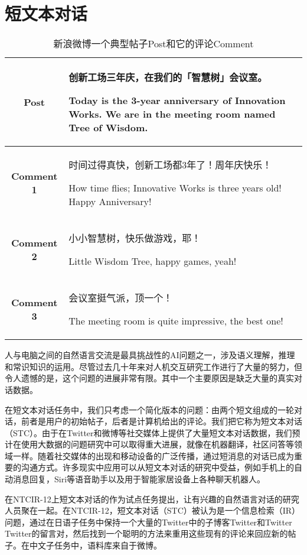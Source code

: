 \chapter{短文本对话}

\begin{table}[htbp]
\centering
\caption{新浪微博一个典型帖子Post和它的评论Comment} \label{tab:example_STC}
\begin{tabular}{|c|p{10cm}|}
    \hline
    \textbf{Post} & 创新工场三年庆，在我们的「智慧树」会议室。\par Today is the 3-year anniversary of Innovation Works. We are in the meeting room named Tree of Wisdom.  \\
    \hline
    \textbf{Comment 1} & 时间过得真快，创新工场都3年了！周年庆快乐！\par How time flies; Innovative Works is three years old! Happy Anniversary!\\
    \hline
	\textbf{Comment 2} & 小小智慧树，快乐做游戏，耶！\par Little Wisdom Tree, happy games, yeah! \\
	\hline
	\textbf{Comment 3} & 会议室挺气派，顶一个！\par The meeting room is quite impressive, the best one! \\
	\hline
\end{tabular}
\end{table}
人与电脑之间的自然语言交流是最具挑战性的AI问题之一，涉及语义理解，推理和常识知识的运用。尽管过去几十年来对人机交互研究工作进行了大量的努力，但令人遗憾的是，这个问题的进展非常有限。其中一个主要原因是缺乏大量的真实对话数据。

在短文本对话任务中，我们只考虑一个简化版本的问题：由两个短文组成的一轮对话，前者是用户的初始帖子，后者是计算机给出的评论。我们把它称为短文本对话（STC）。由于在Twitter和微博等社交媒体上提供了大量短文本对话数据，我们预计在使用大数据的问题研究中可以取得重大进展，就像在机器翻译，社区问答等领域一样。随着社交媒体的出现和移动设备的广泛传播，通过短消息的对话已成为重要的沟通方式。许多现实中应用可以从短文本对话的研究中受益，例如手机上的自动消息回复，Siri等语音助手以及用于智能家居设备上各种聊天机器人。

在NTCIR-12上短文本对话的作为试点任务提出，让有兴趣的自然语言对话的研究人员聚在一起。在NTCIR-12，短文本对话（STC）被认为是一个信息检索（IR）问题，通过在日语子任务中保持一个大量的Twitter中的子博客Twitter和Twitter Twitter的留言对，然后找到一个聪明的方法来重用这些现有的评论来回应新的帖子。在中文子任务中，语料库来自于微博。\cite{shang2016overview}

